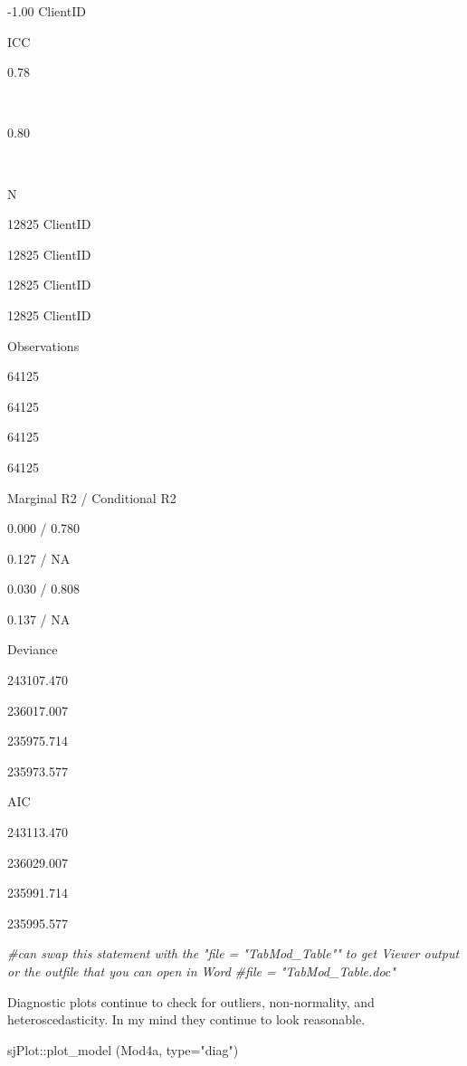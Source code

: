 \documentclass[
  11pt,
]{book}
\newenvironment{Shaded}{\begin{snugshade}}{\end{snugshade}}
\newcommand{\AttributeTok}[1]{\textcolor[rgb]{0.77,0.63,0.00}{#1}}
\newcommand{\CommentTok}[1]{\textcolor[rgb]{0.56,0.35,0.01}{\textit{#1}}}
\newcommand{\FunctionTok}[1]{\textcolor[rgb]{0.00,0.00,0.00}{#1}}
\newcommand{\NormalTok}[1]{#1}
\newcommand{\SpecialCharTok}[1]{\textcolor[rgb]{0.00,0.00,0.00}{#1}}
\newcommand{\StringTok}[1]{\textcolor[rgb]{0.31,0.60,0.02}{#1}}
\begin{document}
-1.00 ClientID

ICC

0.78

~

0.80

~

N

12825 ClientID

12825 ClientID

12825 ClientID

12825 ClientID

Observations

64125

64125

64125

64125

Marginal R2 / Conditional R2

0.000 / 0.780

0.127 / NA

0.030 / 0.808

0.137 / NA

Deviance

243107.470

236017.007

235975.714

235973.577

AIC

243113.470

236029.007

235991.714

235995.577

\begin{Shaded}
\begin{Highlighting}[]
\CommentTok{\#can swap this statement with the "file = "TabMod\_Table"" to get Viewer output or the outfile that you can open in Word}
\CommentTok{\#file = "TabMod\_Table.doc"}
\end{Highlighting}
\end{Shaded}

Diagnostic plots continue to check for outliers, non-normality, and heteroscedasticity. In my mind they continue to look reasonable.

\begin{Shaded}
\begin{Highlighting}[]
\NormalTok{sjPlot}\SpecialCharTok{::}\FunctionTok{plot\_model}\NormalTok{ (Mod4a, }\AttributeTok{type=}\StringTok{"diag"}\NormalTok{)}
\end{Highlighting}
\end{Shaded}
\end{document}
